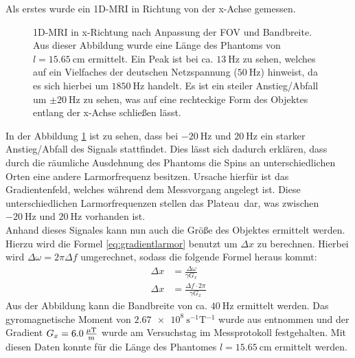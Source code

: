 Als erstes wurde ein 1D-MRI in Richtung von der x-Achse gemessen.
\begin{figure}[H]
    \centering
    
    \caption[1D-MRI in x-Richtung nach Anpassung der FOV und Bandbreite]{1D-MRI in x-Richtung nach Anpassung der FOV und Bandbreite. Aus dieser Abbildung wurde eine Länge des Phantoms von $l=\SI{15,65}{\centi\m}$ ermittelt. Ein Peak ist bei ca. $\SI{13}{\hertz}$ zu sehen, welches auf ein Vielfaches der deutschen Netzspannung ($\SI{50}{\hertz}$) hinweist, da es sich hierbei um $\SI{1850}{\hertz}$ handelt. Es ist ein steiler Anstieg/Abfall um $\pm \SI{20}{\hertz}$ zu sehen, was auf eine \glqq rechteckige\grqq{} Form des Objektes entlang der x-Achse schließen lässt.\label{fig:1Dx}}
\end{figure}
In der Abbildung \ref{fig:1Dx} ist zu sehen, dass bei $\SI{-20}{\hertz}$ und $\SI{20}{\hertz}$ ein starker Anstieg/Abfall des Signals stattfindet. Dies lässt sich dadurch erklären, dass durch die räumliche Ausdehnung des Phantoms die Spins an unterschiedlichen Orten eine andere Larmorfrequenz besitzen. Ursache hierfür ist das Gradientenfeld, welches während dem Messvorgang angelegt ist. Diese unterschiedlichen Larmorfrequenzen stellen das \glqq Plateau\grqq \, dar, was zwischen $\SI{-20}{\hertz}$ und $\SI{20}{\hertz}$ vorhanden ist.\\
Anhand dieses Signales kann  nun auch die Größe des Objektes ermittelt werden. Hierzu wird die Formel \ref{eq:gradientlarmor} benutzt um $\Delta x$ zu berechnen. Hierbei wird $\Delta\omega= 2\pi \Delta f$ umgerechnet, sodass die folgende Formel heraus kommt:
\begin{align}
    \Delta x&=\frac{\Delta\omega}{\gamma G_x}\\
    \Delta x&=\frac{\Delta f \cdot 2\pi}{\gamma G_x}
\end{align}\label{eq:FOV}
Aus der Abbildung kann die Bandbreite von ca. $\SI{40}{\hertz}$ ermittelt werden. 
Das gyromagnetische Moment von $\SI{2.67e8}{\s^{-1}\tesla^{-1}}$ wurde aus \cite{Schmidt} entnommen und der Gradient $G_x=\SI{6,0}{\frac{\mu\tesla}{\m}}$ wurde am Versuchstag im Messprotokoll festgehalten.
Mit diesen Daten konnte für die Länge des Phantomes $l=\SI{15,65}{\centi\m}$ ermittelt werden.\\
